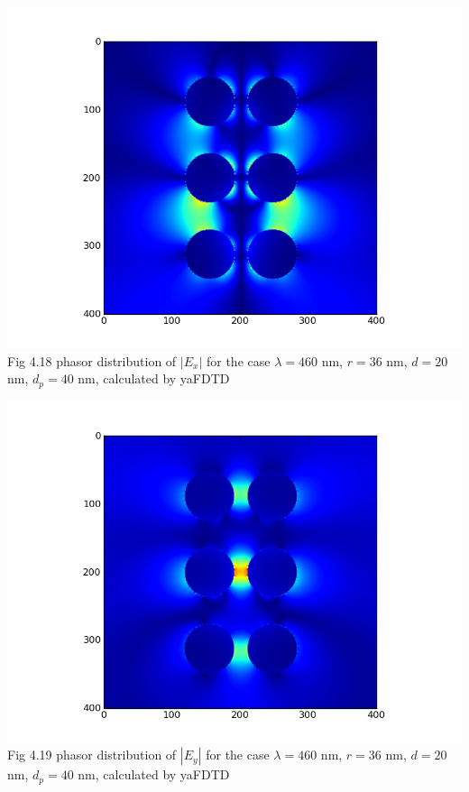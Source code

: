 \documentclass[openany]{book}
\begin{document}
\begin{center}
\includegraphics[scale=0.8]{images/ex-d40.png}\\
Fig 4.18
phasor distribution of $|E_x|$ for the case $\lambda = 460$ nm, $r = 36$ nm, $d = 20$ nm, $d_p = 40$ nm, calculated by yaFDTD
\end{center}

\begin{center}
\includegraphics[scale=0.8]{images/ey-d40.png}\\
Fig 4.19
phasor distribution of $|E_y|$ for the case $\lambda = 460$ nm, $r = 36$ nm, $d = 20$ nm, $d_p = 40$ nm, calculated by yaFDTD
\end{center}
\end{document}
